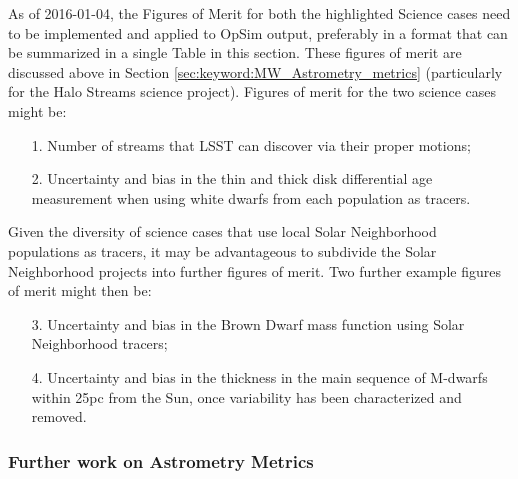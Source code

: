 As of 2016-01-04, the Figures of Merit for both the highlighted
Science cases need to be implemented and applied to OpSim output,
preferably in a format that can be summarized in a single Table in
this section. These figures of merit are discussed above in Section
\ref{sec:keyword:MW_Astrometry_metrics} (particularly for the Halo
Streams science project). Figures of merit for the two science cases
might be:
\begin{itemize}
  \item[1.] Number of streams that LSST can discover via their proper motions;
\item[2.] Uncertainty and bias in the thin and thick disk differential age measurement when using white dwarfs from each population as tracers.
\end{itemize}

Given the diversity of science cases that use local Solar Neighborhood
populations as tracers, it may be advantageous to subdivide the Solar
Neighborhood projects into further figures of merit. Two further example
figures of merit might then be:
\begin{itemize}
  \item[3.] Uncertainty and bias in the Brown Dwarf mass function using Solar Neighborhood tracers;
   \item[4.] Uncertainty and bias in the thickness in the main sequence of M-dwarfs within 25pc from the Sun, once variability has been characterized and removed.
\end{itemize}

\subsubsection{Further work on Astrometry Metrics}

